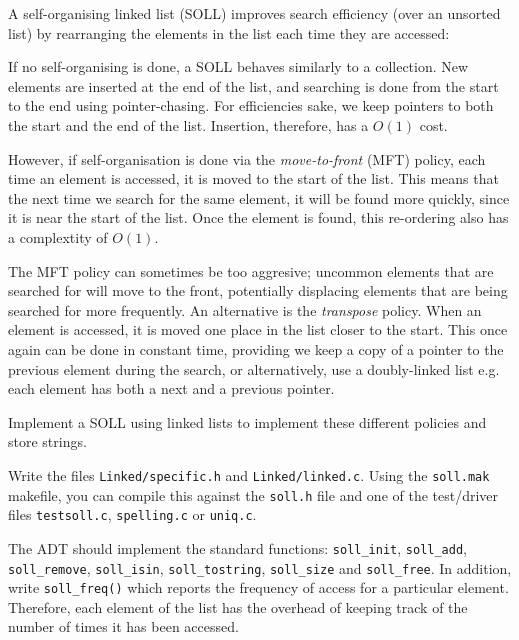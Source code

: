 
A self-organising linked list (SOLL) improves search efficiency (over
an unsorted list) by rearranging the elements in the list each time they
are accessed: 


If no self-organising is done, a SOLL behaves similarly to a collection.
New elements are inserted at the end of the list, and searching is done
from the start to the end using pointer-chasing.  For efficiencies sake,
we keep pointers to both the start and the end of the list. Insertion,
therefore, has a $O(1)$ cost.

However, if self-organisation is done via the {\it move-to-front} (MFT)
policy, each time an element is accessed, it is moved to the start of the
list. This means that the next time we search for the same element, it
will be found more quickly, since it is near the start of the list. Once
the element is found, this re-ordering also has a complextity of $O(1)$.

The MFT policy can sometimes be too aggresive; uncommon elements that
are searched for will move to the front, potentially displacing elements that
are being searched for more frequently. An alternative is the
{\it transpose} policy. When an element is accessed, it is moved one
place in the list closer to the start. This once again can be done in
constant time, providing we keep a copy of a pointer to the previous
element during the search, or alternatively, use a doubly-linked list
e.g. each element has both a next and a previous pointer.


\begin{exercise}

Implement a SOLL using linked lists to implement these different policies
and store strings.

Write the files \verb^Linked/specific.h^ and \verb^Linked/linked.c^. Using
the \verb^soll.mak^ makefile, you can compile this against the
\verb^soll.h^ file and one of the test/driver files \verb^testsoll.c^,
\verb^spelling.c^ or \verb^uniq.c^.

The ADT should implement the standard functions: \verb^soll_init^,
\verb^soll_add^, \verb^soll_remove^, \verb^soll_isin^,
\verb^soll_tostring^, \verb^soll_size^ and \verb^soll_free^.  In addition,
write \verb^soll_freq()^ which reports the frequency of access for a
particular element. Therefore, each element of the list has the
overhead of keeping track of the number of times it has been accessed.

\end{exercise}
